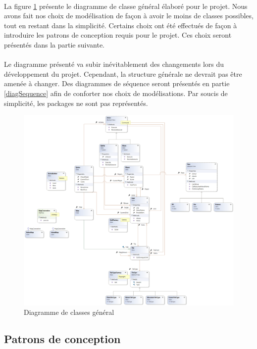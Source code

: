 \paragraph{}
La figure \ref{fig:class} présente le diagramme de classe général élaboré pour le projet.
Nous avons fait nos choix de modélisation de façon à avoir le moins de classes possibles, tout en restant dans la simplicité.
Certains choix ont été effectués de façon à introduire les patrons de conception requis pour le projet. Ces choix seront présentés dans la partie suivante.

\paragraph{}
Le diagramme présenté va subir inévitablement des changements lors du développement du projet. Cependant, la structure générale ne devrait pas être amenée à changer. Des diagrammes de séquence seront présentés en partie \ref{diagSequence} afin de conforter nos choix de modélisations. Par soucis de simplicité, les packages ne sont pas représentés.

\begin{figure}[h]
  \centering
  \includegraphics[width=13cm]{schemas/ClassDiagram.png}
  \caption{Diagramme de classes général}
  \label{fig:class}
\end{figure}

\subsection{Patrons de conception}

